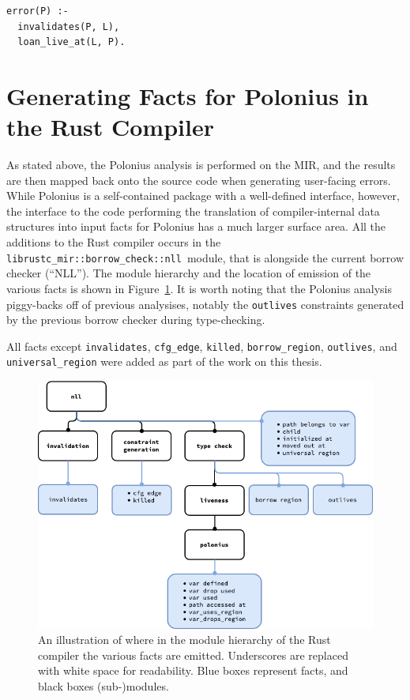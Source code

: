\documentclass[11pt,a4paper,twoside,openany,draft]{report}
\newenvironment{sourcecode}{\captionsetup{type=listing}}{}
\begin{document}
\begin{sourcecode}
  \label{lst:error-invalidates}
\begin{verbatim}
error(P) :-
  invalidates(P, L),
  loan_live_at(L, P).
\end{verbatim}
\end{sourcecode}


\section{Generating Facts for Polonius in the Rust Compiler}

As stated above, the Polonius analysis is performed on the MIR, and the results
are then mapped back onto the source code when generating user-facing errors.
While Polonius is a self-contained package with a well-defined interface,
however, the interface to the code performing the translation of
compiler-internal data structures into input facts for Polonius has a much
larger surface area. All the additions to the Rust compiler occurs in the
\texttt{librustc\_mir::borrow\_check::nll}~module, that is alongside the current
borrow checker (``NLL''). The module hierarchy and the location of emission of
the various facts is shown in Figure~\ref{fig:fact-module-hierarchy}. It is
worth noting that the Polonius analysis piggy-backs off of previous analysises,
notably the \texttt{outlives} constraints generated by the previous borrow
checker during type-checking.

All facts except \texttt{invalidates}, \texttt{cfg\_edge}, \texttt{killed},
\texttt{borrow\_region}, \texttt{outlives}, and \texttt{universal\_region} were
added as part of the work on this thesis.

\begin{figure}
  \includegraphics[width=0.9\linewidth]{Graphs/rustc-module-structure}
  \caption[Polonius In Rust's Module Hierarchy]{An illustration of where in the
    module hierarchy of the Rust compiler the various facts are emitted.
    Underscores are replaced with white space for readability. Blue boxes
    represent facts, and black boxes (sub-)modules.}
  \label{fig:fact-module-hierarchy}
\end{figure}
\end{document}
